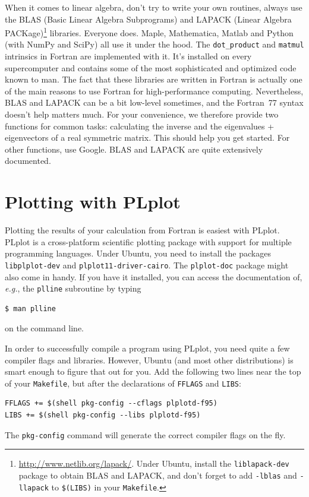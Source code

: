 \documentclass[openany,oneside]{report}
\begin{document}
When it comes to linear algebra, don't try to write your own routines, always use the BLAS (Basic Linear Algebra Subprograms) and LAPACK (Linear Algebra PACKage)\footnote{\url{http://www.netlib.org/lapack/}.
Under Ubuntu, install the \texttt{liblapack-dev} package to obtain BLAS and LAPACK, and don't forget to add \texttt{-lblas} and \texttt{-llapack} to \texttt{\$(LIBS)} in your \texttt{Makefile}.} libraries.
Everyone does.
Maple, Mathematica, Matlab and Python (with NumPy and SciPy) all use it under the hood.
The \texttt{dot\_product} and \texttt{matmul} intrinsics in Fortran are implemented with it.
It's installed on every supercomputer and contains some of the most sophisticated and optimized code known to man.
The fact that these libraries are written in Fortran is actually one of the main reasons to use Fortran for high-performance computing.
Nevertheless, BLAS and LAPACK can be a bit low-level sometimes, and the Fortran~77 syntax doesn't help matters much.
For your convenience, we therefore provide two functions for common tasks: calculating the inverse and the eigenvalues + eigenvectors of a real symmetric matrix.
This should help you get started.
For other functions, use Google.
BLAS and LAPACK are quite extensively documented.




\chapter{Plotting with PLplot}
\label{chap:PLplot}

Plotting the results of your calculation from Fortran is easiest with PLplot.
PLplot is a cross-platform scientific plotting package with support for multiple programming languages.
Under Ubuntu, you need to install the packages \texttt{libplplot-dev} and \texttt{plplot11-driver-cairo}.
The \texttt{plplot-doc} package might also come in handy.
If you have it installed, you can access the documentation of, \emph{e.g.}, the \texttt{plline} subroutine by typing
\begin{verbatim}
$ man plline
\end{verbatim}
on the command line.

In order to successfully compile a program using PLplot, you need quite a few compiler flags and libraries.
However, Ubuntu (and most other distributions) is smart enough to figure that out for you.
Add the following two lines near the top of your \texttt{Makefile}, but after the declarations of \texttt{FFLAGS} and \texttt{LIBS}:
\begin{verbatim}
FFLAGS += $(shell pkg-config --cflags plplotd-f95)
LIBS += $(shell pkg-config --libs plplotd-f95)
\end{verbatim}
The \texttt{pkg-config} command will generate the correct compiler flags on the fly.
\end{document}
